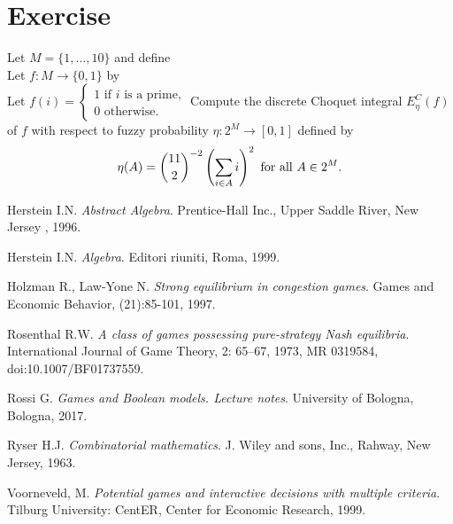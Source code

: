 \documentclass{article}
\begin{document}
\section{Exercise}
Let $M=\{1,\ldots,10\}$ and define \\
Let $f:M\rightarrow\{0,1\}$ by \\
Let $f(i)=\left\{\begin{array}{c}
                        1\text{ if }i\text{ is a prime,}\\
                        0\text{ otherwise.}
             \end{array}\right .$
Compute the discrete Choquet integral $E_{\eta}^C(f)$ of $f$ with respect to fuzzy probability $\eta:2^M\rightarrow[0,1]$ defined by
$$\eta(A)=\binom{11}{2}^{-2}\left(\sum_{i\in A}i\right)^2\text{ for all }A\in 2^M\text .$$


\medskip
 

\begin{thebibliography}{9}
Herstein I.N.
\textit{Abstract Algebra}. 
Prentice-Hall Inc., Upper Saddle River, New Jersey , 1996.

Herstein I.N.
\textit{Algebra}. 
Editori riuniti, Roma, 1999.

Holzman R., Law-Yone N.
\textit{Strong equilibrium in congestion games}.
Games and Economic Behavior, (21):85-101, 1997.

Rosenthal R.W.
\textit{A class of games possessing pure-strategy Nash equilibria}.
International Journal of Game Theory, 2: 65–67, 1973, MR 0319584, doi:10.1007/BF01737559.

Rossi G.
\textit{Games and Boolean models. Lecture notes}.
University of Bologna, Bologna, 2017.

Ryser H.J.
\textit{Combinatorial mathematics}.
J. Wiley and sons, Inc., Rahway, New Jersey, 1963.


Voorneveld, M. 
\textit{Potential games and interactive decisions with multiple criteria}.
Tilburg University: CentER, Center for Economic Research, 1999.

 

\end{thebibliography}
\end{document}
